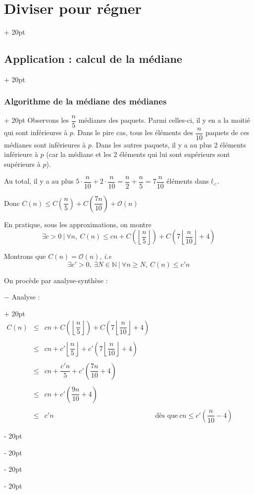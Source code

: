 \documentclass[a4paper, 12pt, twoside]{article}
\newcommand{\N}{\mathbb{N}} %
\newcommand{\lr}[1]{\left( #1 \right)}
\newcommand{\floor}[1]{\left\lfloor #1 \right\rfloor}
\renewcommand{\le}{\leqslant}
\renewcommand{\ge}{\geqslant}
\newcommand{\ind}[1][20pt]{\advance\leftskip + #1}
\newcommand{\deind}[1][20pt]{\advance\leftskip - #1}
\newenvironment{indt}[2][20pt]{#2 \par \ind[#1]}{\par \deind} %
\begin{document}
\begin{indt}{\section{Diviser pour régner}}
\begin{indt}{\subsection{Application : calcul de la médiane}}
\begin{indt}{\subsubsection{Algorithme de la médiane des médianes}}
                Observons les $\dfrac n 5$ médianes des paquets. Parmi celles-ci, il y en a la moitié qui sont inférieures à $p$. Dans le pire cas, tous les éléments des $\dfrac n {10}$ paquets de ces médianes sont inférieures à $p$. Dans les autres paquets, il y a au plus 2 éléments inférieure à $p$ (car la médiane et les 2 éléments qui lui sont supérieurs sont supérieurs à $p$).
                
                Au total, il y a au plus $5 \cdot \dfrac n {10} + 2 \cdot \dfrac n {10} = \dfrac n 2 + \dfrac n 5 = 7\dfrac n {10}$ éléments dans $l_<$.
                
                Donc $C(n) \le C\lr{\dfrac n 5} + C\lr{\dfrac{7n}{10}} + \mathcal O(n)$
                
                En pratique, sous les approximations, on montre
                    \[ \exists c > 0\ |\ \forall n,\ C(n) \le cn + C\lr{\floor{\dfrac n 5}} + C\lr{7\floor{\dfrac n {10}} + 4} \]
                
                Montrons que $C(n) = \mathcal O(n)$, \textit{i.e}
                    \[ \exists c' > 0,\ \exists N \in \N\ |\ \forall n \ge N,\ C(n) \le c'n \]
                
                On procède par analyse-synthèse :
                
                \begin{indt}{$-$ Analyse :}
                    $
                        \begin{array}{rcll}
                            C(n) &\le& cn + C\lr{\floor{\dfrac n 5}} + C\lr{7\floor{\dfrac n {10}} + 4}
                            \\ \\
                            &\le& cn + c'\floor{\dfrac n 5} + c'\lr{7\floor{\dfrac n {10}} + 4}
                            \\ \\
                            &\le& cn + \dfrac{c'n}{5} + c'\lr{\dfrac{7n}{10} + 4}
                            \\ \\
                            &\le& cn + c'\lr{\dfrac{9n}{10} + 4}
                            \\ \\
                            &\le& c'n & \text{dès que}\ cn \le c'\lr{\dfrac n {10} - 4}
                        \end{array}
                    $
                    

\end{indt}
\end{indt}
\end{indt}
\end{indt}
\end{document}
